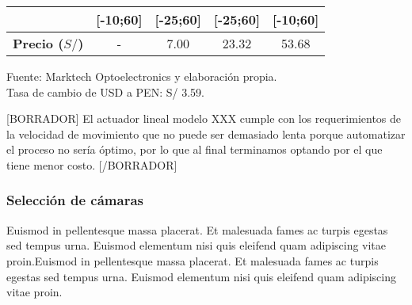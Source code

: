\begin{mytable}[H]
\begin{tabular}{l|c|c|c|c|}
{		} & [-10;60] & [-25;60] & [-25;60] & [-10;60] \\ \hline
		\multicolumn{1}{|l|}{
			\begin{minipage}{\myforthmaxsizeofcontenttable}	
				\textbf{Precio ($S/$)}
			\end{minipage}
		} & - & 7.00 & 23.32 & 53.68 \\ \hline
	\end{tabular}
	\begin{flushleft}	
		Fuente: Marktech Optoelectronics y elaboración propia.\\
		Tasa de cambio de USD a PEN: S/ 3.59.
	\end{flushleft}
\end{mytable}

[BORRADOR] El actuador lineal modelo XXX cumple con los requerimientos de la velocidad de movimiento que no puede ser demasiado lenta porque automatizar el proceso no sería óptimo, por lo que al final terminamos optando por el que tiene menor costo. [/BORRADOR]

\subsubsection{Selección de cámaras} 

Euismod in pellentesque massa placerat. Et malesuada fames ac turpis egestas sed tempus urna. Euismod elementum nisi quis eleifend quam adipiscing vitae proin.Euismod in pellentesque massa placerat. Et malesuada fames ac turpis egestas sed tempus urna. Euismod elementum nisi quis eleifend quam adipiscing vitae proin.

